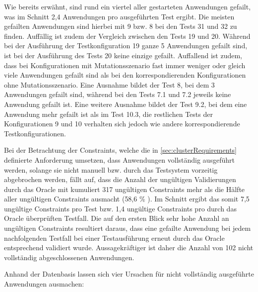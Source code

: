 Wie bereits erwähnt, sind rund ein viertel aller gestarteten Anwendungen gefailt, was im Schnitt 2,4 Anwendungen pro ausgeführten Test ergibt.
Die meisten gefailten Anwendungen sind hierbei mit 9 bzw. 8 bei den Tests 31 und 32 zu finden.
Auffällig ist zudem der Vergleich zwischen den Tests 19 und 20.
Während bei der Ausführung der Testkonfiguration 19 ganze 5 Anwendungen gefailt sind, ist bei der Ausführung des Tests 20 keine einzige gefailt.
Auffallend ist zudem, dass bei Konfigurationen mit Mutationsszenario fast immer weniger oder gleich viele Anwendungen gefailt sind als bei den korrespondierenden Konfigurationen ohne Mutationsszenario.
Eine Ausnahme bildet der Test 8, bei dem 3 Anwendungen gefailt sind, während bei den Tests 7.1 und 7.2 jeweils keine Anwendung gefailt ist.
Eine weitere Ausnahme bildet der Test 9.2, bei dem eine Anwendung mehr gefailt ist als im Test 10.3, die restlichen Tests der Konfigurationen 9 und 10 verhalten sich jedoch wie andere korrespondierende Testkonfigurationen.

Bei der Betrachtung der Constraints, welche die in \autoref{sec:clusterRequirements} definierte Anforderung umsetzen, dass Anwendungen vollständig ausgeführt werden, solange sie nicht manuell bzw. durch das Testsystem vorzeitig abgebrochen werden, fällt auf, dass die Anzahl der ungültigen Validierungen durch das Oracle mit kumuliert 317 ungültigen Constraints mehr als die Hälfte aller ungültigen Constraints ausmacht (58,6 \% ).
Im Schnitt ergibt das somit 7,5 ungültige Constraints pro Test bzw. 1,4 ungültige Constraints pro durch das Oracle überprüften Testfall.
Die auf den ersten Blick sehr hohe Anzahl an ungültigen Constraints resultiert daraus, dass eine gefailte Anwendung bei jedem nachfolgenden Testfall bei einer Testausführung erneut durch das Oracle entsprechend validiert wurde.
Aussagekräftiger ist daher die Anzahl von 102 nicht vollständig abgeschlossenen Anwendungen.

Anhand der Datenbasis lassen sich vier Ursachen für nicht vollständig ausgeführte Anwendungen ausmachen:

